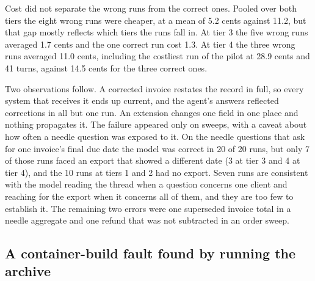 \documentclass{article}
\begin{document}
Cost did not separate the wrong runs from the correct ones. Pooled over both tiers the eight wrong runs were cheaper, at a mean of 5.2 cents against 11.2, but that gap mostly reflects which tiers the runs fall in. At tier 3 the five wrong runs averaged 1.7 cents and the one correct run cost 1.3. At tier 4 the three wrong runs averaged 11.0 cents, including the costliest run of the pilot at 28.9 cents and 41 turns, against 14.5 cents for the three correct ones.

Two observations follow. A corrected invoice restates the record in full, so every system that receives it ends up current, and the agent's answers reflected corrections in all but one run. An extension changes one field in one place and nothing propagates it. The failure appeared only on sweeps, with a caveat about how often a needle question was exposed to it. On the needle questions that ask for one invoice's final due date the model was correct in 20 of 20 runs, but only 7 of those runs faced an export that showed a different date (3 at tier 3 and 4 at tier 4), and the 10 runs at tiers 1 and 2 had no export. Seven runs are consistent with the model reading the thread when a question concerns one client and reaching for the export when it concerns all of them, and they are too few to establish it. The remaining two errors were one superseded invoice total in a needle aggregate and one refund that was not subtracted in an order sweep.

\subsection{A container-build fault found by running the archive}
\label{sec:fault}
\end{document}
